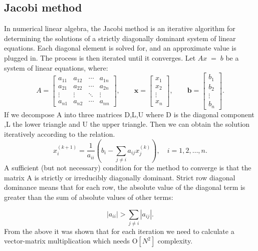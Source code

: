 \documentclass[preprint,pre,floats,aps,amsmath,amssymb]{revtex4}
\begin{document}
\subsection{Jacobi method}
In numerical linear algebra, the Jacobi method is an iterative algorithm for determining the solutions of a strictly diagonally dominant system of linear equations. Each diagonal element is solved for, and an approximate value is plugged in. The process is then iterated until it converges. 
Let $Ax\; =\; b$ be a system of linear equations, where:\newline
$$A={\begin{bmatrix}a_{11}&a_{12}&\cdots &a_{1n}\\a_{21}&a_{22}&\cdots &a_{2n}\\\vdots &\vdots &\ddots &\vdots \\a_{n1}&a_{n2}&\cdots &a_{nn}\end{bmatrix}},\qquad \mathbf {x} ={\begin{bmatrix}x_{1}\\x_{2}\\\vdots \\x_{n}\end{bmatrix}},\qquad \mathbf {b} ={\begin{bmatrix}b_{1}\\b_{2}\\\vdots \\b_{n}\end{bmatrix}}.$$
If we decompose A into three matrices D,L,U where D is the diagonal component ,L the lower triangle and U the upper triangle.
Then we can obtain the solution iteratively according to the relation.
   $$x_{i}^{(k+1)}={\frac {1}{a_{ii}}}\left(b_{i}-\sum _{j\neq i}a_{ij}x_{j}^{(k)}\right),\quad i=1,2,\ldots ,n.$$
   A sufficient (but not necessary) condition for the method to converge is that the matrix A is strictly or irreducibly diagonally dominant. Strict row diagonal dominance means that for each row, the absolute value of the diagonal term is greater than the sum of absolute values of other terms:
   
   $${\displaystyle \left|a_{ii}\right|>\sum _{j\neq i}{\left|a_{ij}\right|}.}$$
   From the above it was shown that for each iteration we need to calculate a vector-matrix multiplication which needs O$[N^2]$ complexity. 
    
\end{document}
